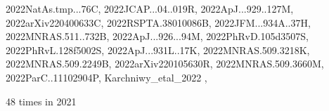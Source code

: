 \documentclass[12pt]{article}
\begin{document}
\begin{description}
{2022NatAs.tmp...76C,%
2022JCAP...04..019R,%
2022ApJ...929..127M,%
2022arXiv220400633C,%
2022RSPTA.38010086B,%
2022JFM...934A..37H,%
2022MNRAS.511..732B,%
2022ApJ...926...94M,%
2022PhRvD.105d3507S,%
2022PhRvL.128f5002S,%
2022ApJ...931L..17K,%
2022MNRAS.509.3218K,%
2022MNRAS.509.2249B,%
2022arXiv220105630R,%
2022MNRAS.509.3660M,%
2022ParC..11102904P,%
Karchniwy_etal_2022%
},\item
\item %
48 times in 2021 \citep{
2021A&A...655A..79B,%
2021MNRAS.508.5538Y,%
2021arXiv211201193C,%
2021A&A...655A..78K,%
2022PhRvL.128v1301K,%
}
\end{description}
\end{document}
